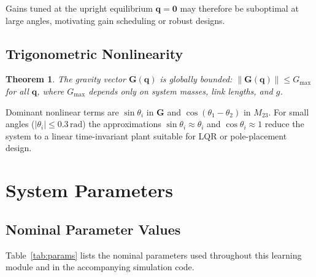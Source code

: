 \documentclass[11pt,a4paper]{article}
\newtheorem{theorem}{Theorem}[section]
\begin{document}
Gains tuned at the upright equilibrium $\mathbf{q} = \mathbf{0}$ may therefore
be suboptimal at large angles, motivating gain scheduling or robust designs.

\subsection{Trigonometric Nonlinearity}

\begin{theorem}
The gravity vector $\mathbf{G}(\mathbf{q})$ is globally bounded:
$\|\mathbf{G}(\mathbf{q})\| \leq G_{\max}$ for all $\mathbf{q}$, where
$G_{\max}$ depends only on system masses, link lengths, and $g$.
\end{theorem}

Dominant nonlinear terms are $\sin\theta_i$ in $\mathbf{G}$ and
$\cos(\theta_1 - \theta_2)$ in $M_{23}$.  For small angles
($|\theta_i| \leq 0.3\,\mathrm{rad}$) the approximations
$\sin\theta_i \approx \theta_i$ and $\cos\theta_i \approx 1$ reduce the
system to a linear time-invariant plant suitable for LQR or pole-placement
design.

\section{System Parameters}

\subsection{Nominal Parameter Values}

Table~\ref{tab:params} lists the nominal parameters used throughout this
learning module and in the accompanying simulation code.
\end{document}
